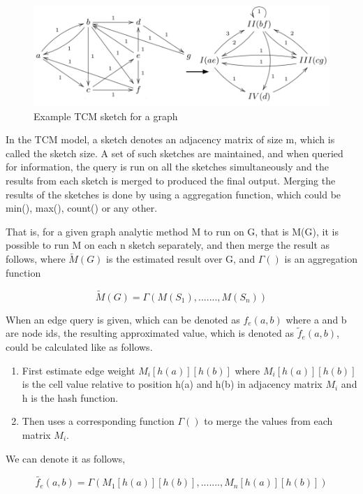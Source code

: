 \documentclass[conference]{IEEEtran}
\begin{document}
\begin{figure}[!t]
\centering
\includegraphics[width=\linewidth]{graph-sketching}
\caption{Example TCM sketch for a graph}
\end{figure}


In the TCM model, a sketch denotes an adjacency matrix of size m, which is called the sketch size. A set of such sketches are maintained, and when queried for information, the query is run on all the sketches simultaneously and the results from each sketch is merged to produced the final output. Merging the results of the sketches is done by using a aggregation function, which could be min(), max(), count() or any other. 


That is, for a given graph analytic method M to run on G, that is M(G), it is possible to run M on each n sketch separately, and then merge the result as follows, where $\tilde{M}(G)$ is the estimated result over G, and $\Gamma()$ is an aggregation function 


\begin{equation}
\tilde{M}(G) = \Gamma(M(S_1), ......., M(S_n))
\end{equation}

When an edge query is given, which can be denoted as $f_e(a,b)$ where a and b are node ids, the resulting approximated value, which is denoted as $\tilde{f}_e(a,b)$, could be calculated like as follows.

\begin{enumerate}
\item First  estimate edge weight $M_i[h(a)][h(b)] $ where $M_i[h(a)][h(b)]$ is the cell value relative to position h(a) and h(b) in adjacency matrix $M_i$ and h is the hash function.
\item Then uses a corresponding function $\Gamma()$ to merge the values from each matrix $M_i$.
\end{enumerate}
 
We can denote it as follows, 

\begin{equation}
\tilde{f_e}(a,b) = \Gamma(M_1[h(a)][h(b)], ......., M_n[h(a)][h(b)])
\end{equation}
\end{document}
